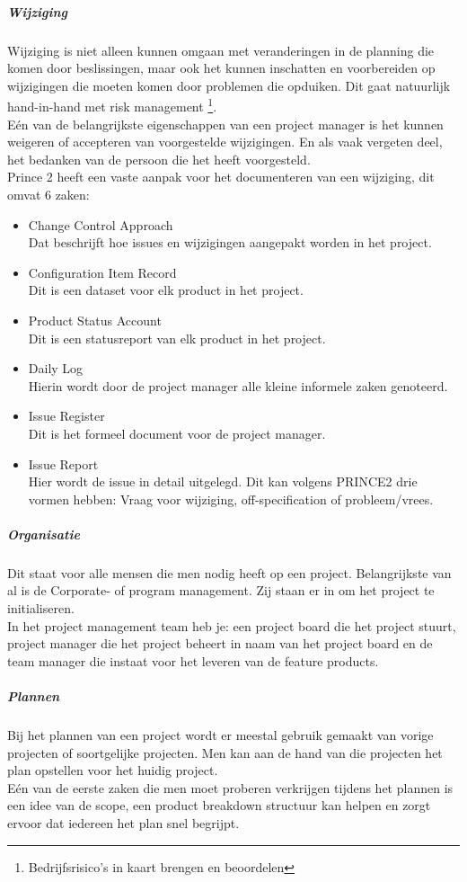 \documentclass[]{article}
\begin{document}
\subparagraph{Wijziging}
Wijziging is niet alleen kunnen omgaan met veranderingen in de planning die komen door beslissingen, maar ook het kunnen inschatten en voorbereiden op wijzigingen die moeten komen door problemen die opduiken. Dit gaat natuurlijk hand-in-hand met risk management \footnote{Bedrijfsrisico's in kaart brengen en beoordelen}.\\
Eén van de belangrijkste eigenschappen van een project manager is het kunnen weigeren of accepteren van voorgestelde wijzigingen. En als vaak vergeten deel, het bedanken van de persoon die het heeft voorgesteld.\\
Prince 2 heeft een vaste aanpak voor het documenteren van een wijziging, dit omvat 6 zaken:
\begin{itemize}
	\item Change Control Approach \\ Dat beschrijft hoe issues en wijzigingen aangepakt worden in het project.
	\item Configuration Item Record \\ Dit is een dataset voor elk product in het project.
	\item Product Status Account \\ Dit is een statusreport van elk product in het project.
	\item Daily Log \\ Hierin wordt door de project manager alle kleine informele zaken genoteerd.
	\item Issue Register \\ Dit is het formeel document voor de project manager.
	\item Issue Report \\ Hier wordt de issue in detail uitgelegd. Dit kan volgens PRINCE2 drie vormen hebben: Vraag voor wijziging, off-specification of probleem/vrees.
\end{itemize}

\subparagraph{Organisatie}
Dit staat voor alle mensen die men nodig heeft op een project. Belangrijkste van al is de Corporate- of program management. Zij staan er in om het project te initialiseren. \\
In het project management team heb je: een project board die het project stuurt, project manager die het project beheert in naam van het project board en de team manager die instaat voor het leveren van de feature products.

\subparagraph{Plannen}
Bij het plannen van een project wordt er meestal gebruik gemaakt van vorige projecten of soortgelijke projecten. Men kan aan de hand van die projecten het plan opstellen voor het huidig project. \\
Eén van de eerste zaken die men moet proberen verkrijgen tijdens het plannen is een idee van de scope, een product breakdown structuur kan helpen en zorgt ervoor dat iedereen het plan snel begrijpt. 
\end{document}
